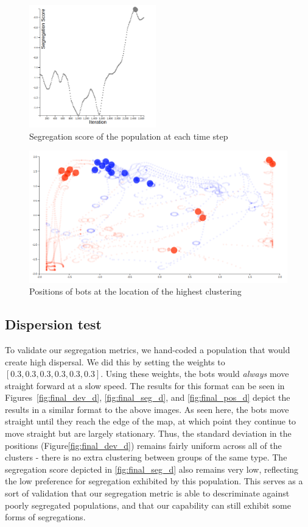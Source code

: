 \begin{figure}
    \centering
    \includegraphics[width=5.5cm]{imgs/final_seg_1.png}
    \caption{Segregation score of the population at each time step}
    \label{fig:final_seg_1}
\end{figure}

\begin{figure}
    \centering
    \includegraphics[width=\linewidth]{imgs/final_place_1.png}
    \caption{Positions of bots at the location of the highest clustering}
    \label{fig:final_pos_1}
\end{figure}

\subsection{Dispersion test}
\label{sec:dispersion}

To validate our segregation metrics, we hand-coded a population that would create high dispersal. 
We did this by setting the weights to $[0.3, 0.3, 0.3, 0.3, 0.3, 0.3]$.
Using these weights, the bots would \emph{always} move straight forward at a slow speed.
The results for this format can be seen in Figures~\ref{fig:final_dev_d}, \ref{fig:final_seg_d}, and \ref{fig:final_pos_d} depict the results in a similar format to the above images. 
As seen here, the bots move straight until they reach the edge of the map, at which point they continue to move straight but are largely stationary. 
Thus, the standard deviation in the positions (Figure\ref{fig:final_dev_d}) remains fairly uniform across all of the clusters - there is no extra clustering between groups of the same type. 
The segregation score depicted in \ref{fig:final_seg_d} also remains very low, reflecting the low preference for segregation exhibited by this population.
This serves as a sort of validation that our segregation metric is able to descriminate against poorly segregated populations, and that our capability can still exhibit some forms of segregations.

